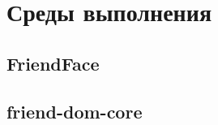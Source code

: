 \documentclass[../index.tex]{subfiles}
\begin{document}
\section{Среды выполнения}\label{environments}

\subsection{FriendFace}

\subsection{friend-dom-core}
\end{document}
